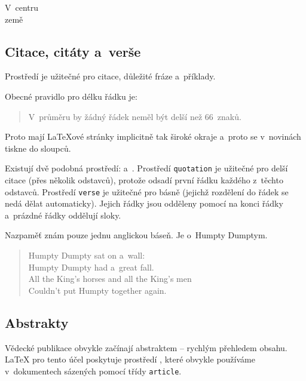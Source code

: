 \begin{example}
\begin{center}
V~centru\\země
\end{center}
\end{example}

\subsection{Citace, citáty a~verše}

Prostředí  je užitečné pro citace, důležité fráze a~příklady.

\begin{example}
Obecné pravidlo pro
délku řádku je:
\begin{quote}
V~průměru by žádný řádek
neměl být delší než 66~znaků.
\end{quote}
Proto mají \LaTeX ové stránky
implicitně tak široké okraje
a~proto se v~novinách tiskne
do sloupců.
\end{example}

Existují dvě podobná prostředí:  a~.
Prostředí \texttt{quotation} je užitečné pro delší citace (přes několik odstavců),
protože odsadí první řádku každého z~těchto odstavců. Prostředí \texttt{verse} je
užitečné pro básně (jejichž rozdělení do řádek se nedá dělat automaticky).
Jejich řádky jsou odděleny pomocí \ci{\bs} na konci řádky a~prázdné
řádky oddělují sloky.

\begin{example}
Nazpaměť znám pouze jednu
anglickou báseň.
Je o~Humpty Dumptym.
\begin{flushleft}
\begin{verse}
Humpty Dumpty sat on a~wall:\\
Humpty Dumpty had a~great
   fall.\\ 
All the King's horses and all
the King's men\\
Couldn't put Humpty together
again.
\end{verse}
\end{flushleft}
\end{example}

\subsection{Abstrakty}

Vědecké publikace obvykle začínají abstraktem -- rychlým přehledem obsahu.
\LaTeX{} pro tento účel poskytuje prostředí , které
obvykle používáme v~dokumentech sázených pomocí třídy \texttt{article}.


